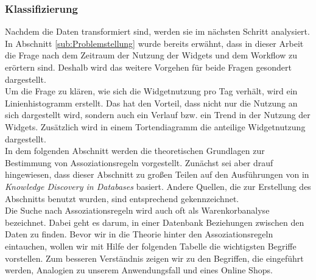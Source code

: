 \subsubsection{Klassifizierung}
\label{ssub:Klassifizierung}
Nachdem die Daten transformiert sind, werden sie im nächsten Schritt analysiert. In Abschnitt \ref{sub:Problemstellung} wurde bereits erwähnt, dass in dieser Arbeit die Frage nach dem Zeitraum der Nutzung der Widgets und dem Workflow zu erörtern sind. Deshalb wird das weitere Vorgehen für beide Fragen gesondert dargestellt.
\\
Um die Frage zu klären, wie sich die Widgetnutzung pro Tag verhält, wird ein Linienhistogramm erstellt. Das hat den Vorteil, dass nicht nur die Nutzung an sich dargestellt wird, sondern auch ein Verlauf bzw. ein Trend in der Nutzung der Widgets. Zusätzlich wird in einem Tortendiagramm die anteilige Widgetnutzung dargestellt.
\\
In dem folgenden Abschnitt werden die theoretischen Grundlagen zur Bestimmung von Assoziationsregeln vorgestellt. Zunächst sei aber drauf hingewiesen, dass dieser Abschnitt zu großen Teilen auf den Ausführungen von \citet{EsSa00} in \glqq\textit{Knowledge Discovery in Databases}\grqq{} basiert. Andere Quellen, die zur Erstellung des Abschnitts benutzt wurden, sind entsprechend gekennzeichnet.\\
Die Suche nach Assoziationsregeln wird auch oft als Warenkorbanalyse bezeichnet. Dabei geht es darum, in einer Datenbank Beziehungen zwischen den Daten zu finden. Bevor wir in die Theorie hinter den Assoziationsregeln eintauchen, wollen wir mit Hilfe der folgenden Tabelle die wichtigsten Begriffe vorstellen. Zum besseren Verständnis zeigen wir zu den Begriffen, die eingeführt werden, Analogien zu unserem Anwendungsfall und eines Online Shops.
\clearpage
